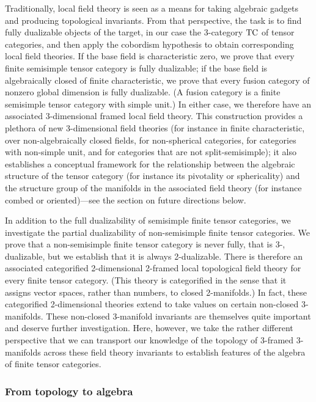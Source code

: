 \documentclass{amsart}
\begin{document}
Traditionally, local field theory is seen as a means for taking algebraic gadgets and producing topological invariants.  From that perspective, the task is to find fully dualizable objects of the target, in our case the 3-category $\mathrm{TC}$ of tensor categories, and then apply the cobordism hypothesis to obtain corresponding local field theories.  If the base field is characteristic zero, we prove that every finite semisimple tensor category is fully dualizable; if the base field is algebraically closed of finite characteristic, we prove that every fusion category of nonzero global dimension is fully dualizable.  (A fusion category is a finite semisimple tensor category with simple unit.)  In either case, we therefore have an associated 3-dimensional framed local field theory.  This construction provides a plethora of new 3-dimensional field theories (for instance in finite characteristic, over non-algebraically closed fields, for non-spherical categories, for categories with non-simple unit, and for categories that are not split-semisimple); %
it also establishes a conceptual framework for the relationship between the algebraic structure of the tensor category (for instance its pivotality or sphericality) and the structure group of the manifolds in the associated field theory (for instance combed or oriented)---see the section on future directions below.  

In addition to the full dualizability of semisimple finite tensor categories, we investigate the partial dualizability of non-semisimple finite tensor categories.  We prove that a non-semisimple finite tensor category is never fully, that is 3-, dualizable, but we establish that it is always 2-dualizable.  There is therefore an associated categorified 2-dimensional 2-framed local topological field theory for every finite tensor category.  (This theory is categorified in the sense that it assigns vector spaces, rather than numbers, to closed 2-manifolds.)  In fact, these categorified 2-dimensional theories extend to take values on certain non-closed 3-manifolds.  These non-closed 3-manifold invariants are themselves quite important and deserve further investigation.  Here, however, we take the rather different perspective that we can transport our knowledge of the topology of 3-framed 3-manifolds across these field theory invariants to establish features of the algebra of finite tensor categories.



\subsubsection{From topology to algebra}
\end{document}
